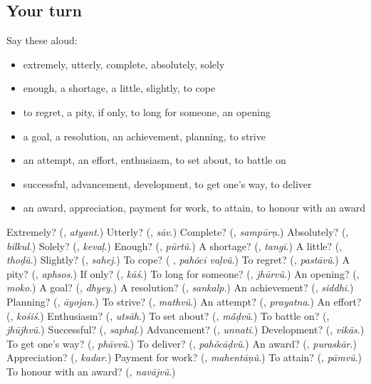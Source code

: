\subsection*{Your turn}
Say these aloud:

\begin{itemize}
\raggedright
  \item extremely, utterly, complete, absolutely, solely
  \item enough, a shortage, a little, slightly, to cope
  \item to regret, a pity, if only, to long for someone, an opening
  \item a goal, a resolution, an achievement, planning, to strive
  \item an attempt, an effort, enthusiasm, to set about, to battle on
  \item successful, advancement, development, to get one's way, to deliver
  \item an award, appreciation, payment for work, to attain, to honour with an award
\end{itemize}

\begin{tcolorbox}[breakable,colback=teal!4,colframe=teal!35!black,title={Before you move on}]
Extremely? (\textbf{}, \emph{atyant}.) Utterly? (\textbf{}, \emph{sāv}.) Complete? (\textbf{}, \emph{sampūrṇ}.) Absolutely? (\textbf{}, \emph{bilkul}.) Solely? (\textbf{}, \emph{kevaḷ}.) Enough? (\textbf{}, \emph{pūrtũ}.) A shortage? (\textbf{}, \emph{tangī}.) A little? (\textbf{}, \emph{thoḍũ}.) Slightly? (\textbf{}, \emph{sahej}.) To cope? (\textbf{ }, \emph{pahõcī vaḷvũ}.) To regret? (\textbf{}, \emph{pastāvũ}.) A pity? (\textbf{}, \emph{aphsos}.) If only? (\textbf{}, \emph{kāś}.) To long for someone? (\textbf{}, \emph{jhūrvũ}.) An opening? (\textbf{}, \emph{moko}.) A goal? (\textbf{}, \emph{dhyey}.) A resolution? (\textbf{}, \emph{sankalp}.) An achievement? (\textbf{}, \emph{siddhi}.) Planning? (\textbf{}, \emph{āyojan}.) To strive? (\textbf{}, \emph{mathvũ}.) An attempt? (\textbf{}, \emph{prayatna}.) An effort? (\textbf{}, \emph{kośiś}.) Enthusiasm? (\textbf{}, \emph{utsāh}.) To set about? (\textbf{}, \emph{mā̃ḍvũ}.) To battle on? (\textbf{}, \emph{jhūjhvũ}.) Successful? (\textbf{}, \emph{saphaḷ}.) Advancement? (\textbf{}, \emph{unnati}.) Development? (\textbf{}, \emph{vikās}.) To get one's way? (\textbf{}, \emph{phāvvũ}.) To deliver? (\textbf{}, \emph{pahõcāḍvũ}.) An award? (\textbf{}, \emph{puraskār}.) Appreciation? (\textbf{}, \emph{kadar}.) Payment for work? (\textbf{}, \emph{mahentāṇũ}.) To attain? (\textbf{}, \emph{pāmvũ}.) To honour with an award? (\textbf{}, \emph{navājvũ}.)
\end{tcolorbox}
